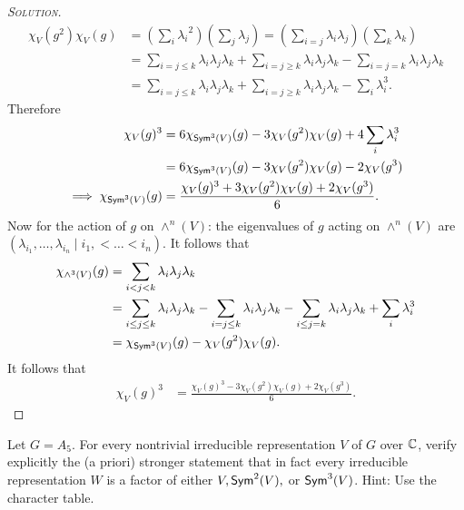 \begin{proof}[{\scshape Solution}]
\[
\begin{aligned}
  \chi_V(g^2)\chi_V(g) &= \left(\sum_i{\lambda_i}^2\right)\left(\sum_j{\lambda_j}\right) = \left(\sum_{i=j}{\lambda_i\lambda_j}\right)\left(\sum_k{\lambda_k}\right) \\
  &= \sum_{i = j \leq k}\lambda_i\lambda_j\lambda_k + \sum_{i = j \geq k}\lambda_i\lambda_j\lambda_k - \sum_{i = j = k}\lambda_i\lambda_j\lambda_k \\
  &= \sum_{i = j \leq k}\lambda_i\lambda_j\lambda_k + \sum_{i = j \geq k}\lambda_i\lambda_j\lambda_k - \sum_{i}\lambda_i^3.
\end{aligned}
\]
Therefore
\[
\begin{aligned}
  \chi_V(g)^3 &= 6\chi_{\mathsf{Sym}^3(V)}(g) - 3\chi_V(g^2)\chi_V(g) + 4\sum_i \lambda_i^3 \\
  &= 6\chi_{\mathsf{Sym}^3(V)}(g) - 3\chi_V(g^2)\chi_V(g) - 2 \chi_V(g^3) \\
  \implies \chi_{\mathsf{Sym}^3(V)}(g) &= \frac{\chi_V(g)^3 + 3\chi_V(g^2)\chi_V(g) + 2 \chi_V(g^3)}{6}.
\end{aligned}
\]
Now for the action of $g$ on $\wedge^n(V)$: the eigenvalues of $g$ acting on $\wedge^n(V)$ are $(\lambda_{i_1}, \ldots, \lambda_{i_n} \mid i_1, < \ldots < i_n)$. It follows that
\[
\begin{aligned}
\chi_{\wedge^3(V)}(g) &= \sum_{i < j < k} \lambda_i\lambda_j\lambda_k \\
&= \sum_{i \leq j \leq k} \lambda_i\lambda_j\lambda_k - \sum_{i = j \leq k} \lambda_i\lambda_j\lambda_k - \sum_{i \leq j = k} \lambda_i\lambda_j\lambda_k + \sum_i\lambda_i^3 \\
&= \chi_{\mathsf{Sym}^3(V)}(g) - \chi_V(g^2)\chi_V(g).
\end{aligned}
\]
It follows that
\[
\begin{aligned}
\chi_V(g)^3 &= \frac{\chi_V(g)^3 -3\chi_V(g^2)\chi_V(g) + 2 \chi_V(g^3)}{6}.
\end{aligned}
\]

\end{proof}

\newpage

\begin{problem}
Let $G = A_5$. For every nontrivial irreducible representation $V$ of $G$ over $\mathbb{C}$, verify explicitly the (a priori) stronger statement that in fact every irreducible representation $W$ is a factor of either $V, \mathsf{Sym}^2(V),$ or $\mathsf{Sym}^3(V)$. Hint: Use the character table.
\end{problem}


